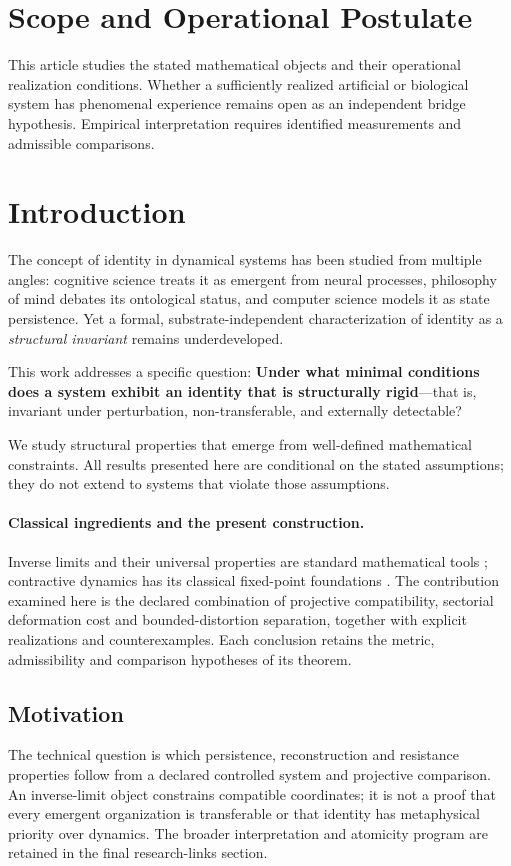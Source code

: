 \documentclass[11pt,a4paper]{article}
\theoremstyle{plain}
\theoremstyle{definition}
\theoremstyle{remark}
\begin{document}
\section*{Scope and Operational Postulate}
This article studies the stated mathematical objects and their operational
realization conditions. Whether a sufficiently realized artificial or biological
system has phenomenal experience remains open as an independent bridge
hypothesis. Empirical interpretation requires identified measurements and
admissible comparisons.

\section{Introduction}

The concept of identity in dynamical systems has been studied from multiple angles: cognitive science treats it as emergent from neural processes, philosophy of mind debates its ontological status, and computer science models it as state persistence. Yet a formal, substrate-independent characterization of identity as a \textit{structural invariant} remains underdeveloped.

This work addresses a specific question: \textbf{Under what minimal conditions does a system exhibit an identity that is structurally rigid}---that is, invariant under perturbation, non-transferable, and externally detectable?

We study structural properties that emerge from well-defined mathematical constraints. All results presented here are conditional on the stated assumptions; they do not extend to systems that violate those assumptions.

\paragraph{Classical ingredients and the present construction.}
Inverse limits and their universal properties are standard mathematical
tools \cite{maclane1998,ribes}; contractive dynamics has its classical
fixed-point foundations \cite{banach}. The contribution examined here is
the declared combination of projective compatibility, sectorial deformation
cost and bounded-distortion separation, together with explicit realizations
and counterexamples. Each conclusion retains the metric, admissibility and
comparison hypotheses of its theorem.

\subsection{Motivation}
The technical question is which persistence, reconstruction and resistance properties follow from a declared controlled system and projective comparison. An inverse-limit object constrains compatible coordinates; it is not a proof that every emergent organization is transferable or that identity has metaphysical priority over dynamics. The broader interpretation and atomicity program are retained in the final research-links section.
\end{document}

